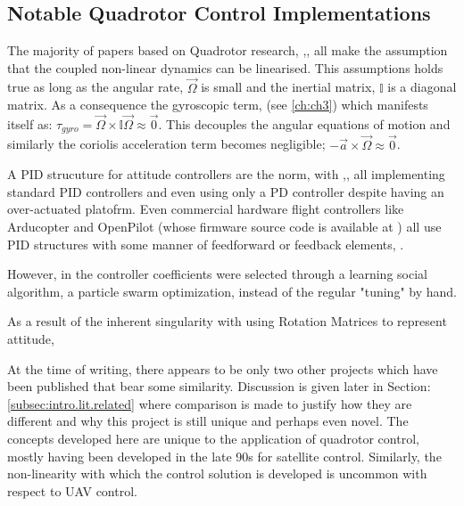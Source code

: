 \subsection{Notable Quadrotor Control Implementations}
\label{subsec:intro.lit.control}
The majority of papers based on Quadrotor research, \cite{quaddynamics},\cite{optimizedPID}, \cite{fourrotorrobot} all make the assumption that the coupled non-linear dynamics can be linearised. This assumptions holds true as long as the angular rate, $\vec{\Omega}$ is small and the inertial matrix, $\mathbb{I}$ is a diagonal matrix. As a consequence the gyroscopic term, (see \ref{ch:ch3}) which manifests itself as: $\tau _{gyro} = \vec{\Omega} \times \mathbb{I} \vec{\Omega} \approx \vec{0}$. This decouples the angular equations of motion and similarly the coriolis acceleration term becomes negligible; $-\vec{a} \times \vec{\Omega} \approx \vec{0}$.
\par
A PID strucuture for attitude controllers are the norm, with \cite{optimizedPID},\cite{quaddynamics},\cite{tiltpropellerflight} all implementing standard PID controllers and even \cite{singleaxistilting} using only a PD controller despite having an over-actuated platofrm. Even commercial hardware flight controllers like Arducopter\cite{arducopter} and OpenPilot \cite{openpilot}(whose firmware source code is available at \cite{openpilotgit}) all use PID structures with some manner of feedforward or feedback elements, \cite{buildyourownquad}.

However, in \cite{optimizedPID} the controller coefficients were selected through a learning social algorithm, a particle swarm optimization, instead of the regular "tuning" by hand. 
\par
As a result of the inherent singularity with using Rotation Matrices to represent attitude, 

At the time of writing, there appears to be only two other projects which have been published that bear some similarity. Discussion is given later in Section:\ref{subsec:intro.lit.related} where comparison is made to justify how they are different and why this project is still unique and perhaps even novel. The concepts developed here are unique to the application of quadrotor control, mostly having been developed in the late 90s for satellite control. Similarly, the non-linearity with which the control solution is developed is uncommon with respect to UAV control.